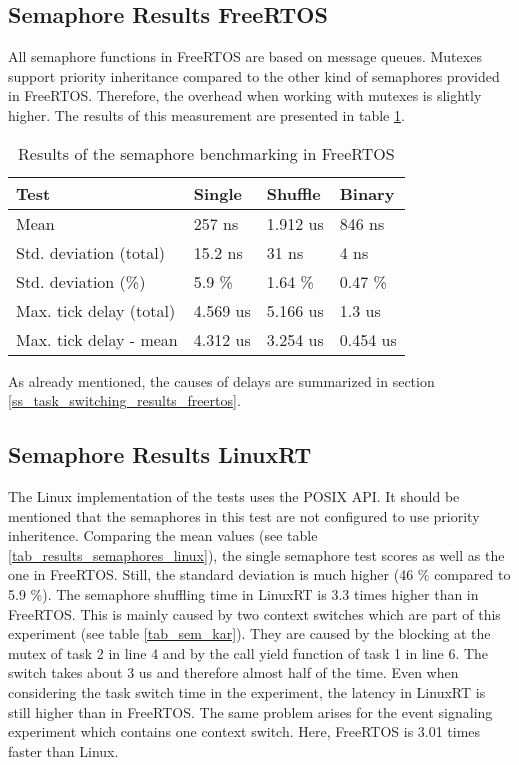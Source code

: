 \subsection{Semaphore Results FreeRTOS}
All semaphore functions in FreeRTOS are based on message queues.
Mutexes support priority inheritance compared to the other kind of semaphores provided in FreeRTOS.
Therefore, the overhead when working with mutexes is slightly higher. 
The results of this measurement are presented in table \ref{tab_results_semaphores_freertos}. 

\begin{table}[htbp]
	\centering
		\begin{tabular}{|l||l|l|l|}
			\hline
				Test 											& Single 		& Shuffle 	& Binary 	  \\
				\hline 
				Mean  										& 257 ns		& 1.912 us	& 846 ns	  \\
			  \hline
			  Std. deviation (total)	  & 15.2 ns		& 31 ns			&	4 ns		  \\
			  \hline
			  Std. deviation (\%)  			& 5.9 \%		& 1.64 \%		&	0.47 \%   \\ 
			  \hline
			  Max. tick delay	(total)		& 4.569 us	& 5.166 us	&	1.3 us    \\
				\hline
				Max. tick delay - mean		&	4.312	us	&	3.254	us	&	0.454 us  \\
			\hline
		\end{tabular}
	\caption{Results of the semaphore benchmarking in FreeRTOS}
	\label{tab_results_semaphores_freertos}
\end{table}

As already mentioned, the causes of delays are summarized in section \ref{ss_task_switching_results_freertos}.

\subsection{Semaphore Results LinuxRT}
The Linux implementation of the tests uses the POSIX \ac{API}.
It should be mentioned that the semaphores in this test are not configured to use priority inheritence. 
Comparing the mean values (see table \ref{tab_results_semaphores_linux}), the single semaphore test scores as well as the one in FreeRTOS.
Still, the standard deviation is much higher (46 \% compared to 5.9 \%).
The semaphore shuffling time in LinuxRT is 3.3 times higher than in FreeRTOS.
This is mainly caused by two context switches which are part of this experiment (see table \ref{tab_sem_kar}). 
They are caused by the blocking at the mutex of task 2 in line 4 and by the call yield function of task 1 in line 6.
The switch takes about 3 us and therefore almost half of the time. 
Even when considering the task switch time in the experiment, the latency in LinuxRT is still higher than in FreeRTOS.
The same problem arises for the event signaling experiment which contains one context switch.
Here, FreeRTOS is 3.01 times faster than Linux. 

